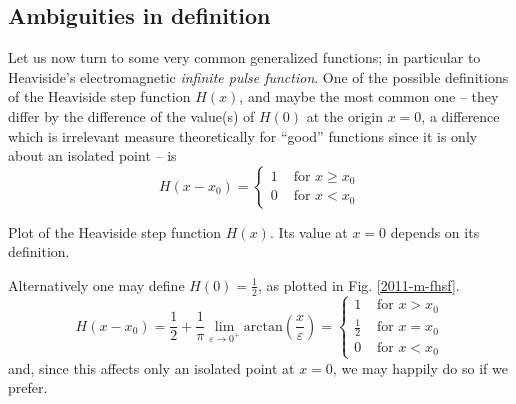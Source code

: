 \subsection{Ambiguities in definition}
Let us now turn to some very common generalized functions; in particular
to Heaviside's electromagnetic {\em infinite pulse function}.
One of the possible definitions of the Heaviside step function $H(x)$, and maybe the most common one --
they differ by the difference of the value(s) of $H(0)$ at the origin $x=0$, a difference which is irrelevant measure theoretically for ``good'' functions
since it is only about an isolated point --
is
\begin{equation}
H(x-x_0)
=
\left\{
\begin{array}{rl}
1&\textrm{ for } x\ge x_0\\
0&\textrm{ for } x < x_0
\end{array}
\right.
\label{2011-m-di-edhf}
\end{equation}
\begin{marginfigure}
\begin{center}
\end{center}
\caption{Plot of the Heaviside step function  $H(x)$.
Its value at $x=0$ depends on its definition.}
\label{2011-m-fhsf}
\end{marginfigure}
Alternatively one may define $H(0)=\frac{1}{2}$, as plotted in Fig. \ref{2011-m-fhsf}.
\begin{equation}
H(x-x_0)
=   \frac{1}{2} + \frac{1}{\pi } \lim_{\varepsilon \rightarrow 0^+} \textrm{arctan}\left( \frac{x}{\varepsilon} \right)
=
\left\{
\begin{array}{rl}
1&\textrm{ for } x > x_0\\
\frac{1}{2}&\textrm{ for } x = x_0\\
0&\textrm{ for } x < x_0
\end{array}
\right.
\label{2012-m-di-hsfoh}
\end{equation}
and, since this affects only an isolated point at $x=0$, we may happily do so if we prefer.

